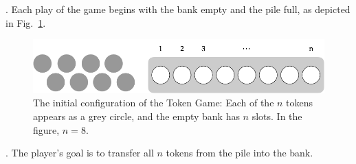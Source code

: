 \smallskip

.
Each play of the game begins with the bank empty and the pile full, as depicted in Fig.~\ref{fig:jeujetonsInit}.
\begin{figure}[htb]
\begin{center}
        \includegraphics[scale=0.35]{FiguresMaths/GameTokenInit.png}
\caption{The initial configuration of the Token Game: Each of the $n$ tokens appears as a grey circle, and the empty bank has $n$ slots.  In the figure, $n=8$.}
        \label{fig:jeujetonsInit}
\end{center}
\end{figure}

\medskip

.
The player's goal is to transfer all $n$ tokens from the pile into the bank.

\medskip

